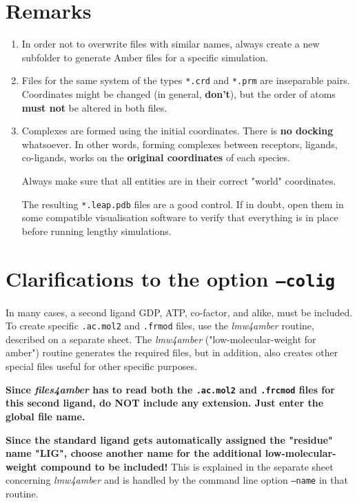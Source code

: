 \documentclass[10pt,landscape,twocolumn]{article}
\begin{document}
\section{\textbf{Remarks}}
\begin{enumerate}
\item In order not to overwrite files with similar names, always create a new subfolder to generate Amber files for a specific simulation. 

\item Files for the same system of the types \texttt{*.crd} and \texttt{*.prm} are inseparable pairs. Coordinates might be changed (in general, \textbf{don't}), but the order of atoms \textbf{must not} be altered in both files.

\item Complexes are formed using the initial coordinates. There is \textbf{no docking} whatsoever. In other words, forming complexes between receptors, ligands, co-ligands, works on the \textbf{original coordinates} of each species. \begin{mdframed}Always make sure that all entities are in their correct "world" coordinates.\end{mdframed} The resulting \texttt{*.leap.pdb} files are a good control. If in doubt, open them in some compatible visualisation software to verify that everything is in place before running lengthy simulations.
\end{enumerate}


\section{Clarifications to the option \textbf{\texttt{--colig}}}

In many cases, a second ligand GDP, ATP, co-factor, and alike, must be included. To create specific \texttt{.ac.mol2} and \texttt{.frmod} files, use the \textsl{lmw4amber} routine, described on a separate sheet. The \textsl{lmw4amber} ("low-molecular-weight for amber") routine generates the required files, but in addition, also creates other special files useful for other specific purposes. 

\textbf{Since \textsl{files4amber} has to read both the \texttt{.ac.mol2} and \texttt{.frcmod} files for this second ligand, do NOT include any extension. Just enter the global file name.}

\textbf{Since the standard ligand gets automatically assigned the "residue" name "LIG", choose another name for the additional low-molecular-weight compound to be included!} This is explained in the separate sheet concerning \textsl{lmw4amber} and is handled by the command line option \texttt{--name} in that routine.

 
\end{document}
